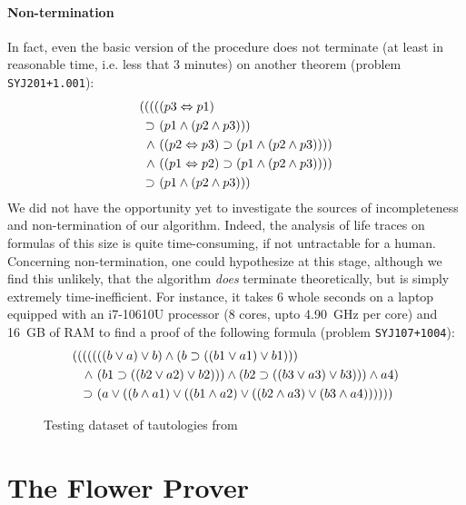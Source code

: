 \begin{scope}
\paragraph{Non-termination}

In fact, even the basic version of the  procedure does not
terminate (at least in reasonable time, i.e. less that 3 minutes) on another
 theorem (problem \texttt{SYJ201+1.001}):
\begin{align*}
((((&(p3 \Leftrightarrow p1)\\
\supset ~&(p1 \land (p2 \land p3)))\\
\land ~&((p2 \Leftrightarrow p3) \supset (p1 \land (p2 \land p3))))\\
\land ~&((p1 \Leftrightarrow p2) \supset (p1 \land (p2 \land p3))))\\
\supset ~&(p1 \land (p2 \land p3)))
\end{align*}
We did not have the opportunity yet to investigate the sources of incompleteness
and non-termination of our algorithm. Indeed, the analysis of life traces on
formulas of this size is quite time-consuming, if not untractable for a human.
Concerning non-termination, one could hypothesize at this stage, although we
find this unlikely, that the algorithm \emph{does} terminate theoretically, but
is simply extremely time-inefficient. For instance, it takes 6 whole seconds on a laptop
equipped with an i7-10610U processor (8 cores, upto 4.90~GHz per core) and 16~GB
of RAM to find a proof of the following formula (problem \texttt{SYJ107+1004}):
\begin{align*}
  (((((&((b \lor a) \lor b) \land (b \supset ((b1 \lor a1) \lor b1)))\\
  \land ~&(b1 \supset ((b2 \lor a2) \lor b2))) \land (b2 \supset ((b3 \lor a3) \lor b3))) \land a4)\\
  \supset ~&(a \lor ((b \land a1) \lor ((b1 \land a2) \lor ((b2 \land a3) \lor (b3 \land a4))))))
\end{align*}

\begin{figure*}
  
  \caption{Testing dataset of tautologies from }
\end{figure*}

\section{The Flower Prover}


\end{scope}
